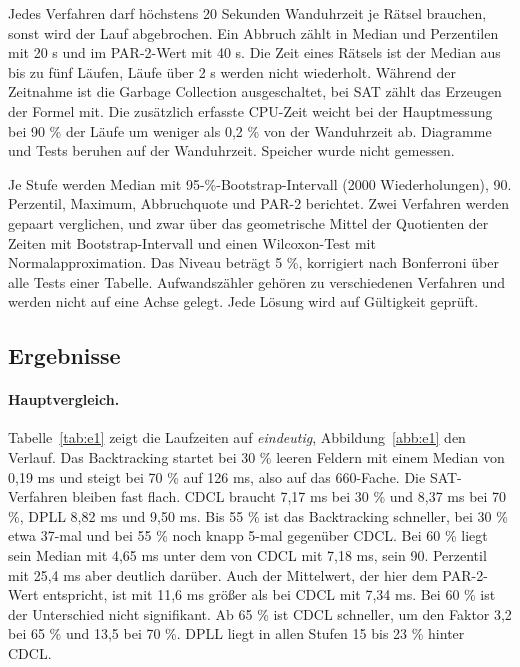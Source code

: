 Jedes Verfahren darf höchstens 20 Sekunden Wanduhrzeit je Rätsel brauchen, sonst wird der Lauf abgebrochen. Ein Abbruch zählt in Median und Perzentilen mit 20 s und im PAR-2-Wert mit 40 s. Die Zeit eines Rätsels ist der Median aus bis zu fünf Läufen, Läufe über 2 s werden nicht wiederholt. Während der Zeitnahme ist die Garbage Collection ausgeschaltet, bei SAT zählt das Erzeugen der Formel mit. Die zusätzlich erfasste CPU-Zeit weicht bei der Hauptmessung bei 90 \% der Läufe um weniger als 0,2 \% von der Wanduhrzeit ab. Diagramme und Tests beruhen auf der Wanduhrzeit. Speicher wurde nicht gemessen.

Je Stufe werden Median mit 95-\%-Bootstrap-Intervall (2000 Wiederholungen), 90. Perzentil, Maximum, Abbruchquote und PAR-2 berichtet. Zwei Verfahren werden gepaart verglichen, und zwar über das geometrische Mittel der Quotienten der Zeiten mit Bootstrap-Intervall und einen Wilcoxon-Test mit Normalapproximation. Das Niveau beträgt 5 \%, korrigiert nach Bonferroni über alle Tests einer Tabelle. Aufwandszähler gehören zu verschiedenen Verfahren und werden nicht auf eine Achse gelegt. Jede Lösung wird auf Gültigkeit geprüft.

\subsection{Ergebnisse}\label{sec:ergebnisse}
\paragraph{Hauptvergleich.} Tabelle~\ref{tab:e1} zeigt die Laufzeiten auf \emph{eindeutig}, Abbildung~\ref{abb:e1} den Verlauf. Das Backtracking startet bei 30 \% leeren Feldern mit einem Median von 0,19 ms und steigt bei 70 \% auf 126 ms, also auf das 660-Fache. Die SAT-Verfahren bleiben fast flach. CDCL braucht 7,17 ms bei 30 \% und 8,37 ms bei 70 \%, DPLL 8,82 ms und 9,50 ms. Bis 55 \% ist das Backtracking schneller, bei 30 \% etwa 37-mal und bei 55 \% noch knapp 5-mal gegenüber CDCL. Bei 60 \% liegt sein Median mit 4,65 ms unter dem von CDCL mit 7,18 ms, sein 90. Perzentil mit 25,4 ms aber deutlich darüber. Auch der Mittelwert, der hier dem PAR-2-Wert entspricht, ist mit 11,6 ms größer als bei CDCL mit 7,34 ms. Bei 60 \% ist der Unterschied nicht signifikant. Ab 65 \% ist CDCL schneller, um den Faktor 3,2 bei 65 \% und 13,5 bei 70 \%. DPLL liegt in allen Stufen 15 bis 23 \% hinter CDCL.

